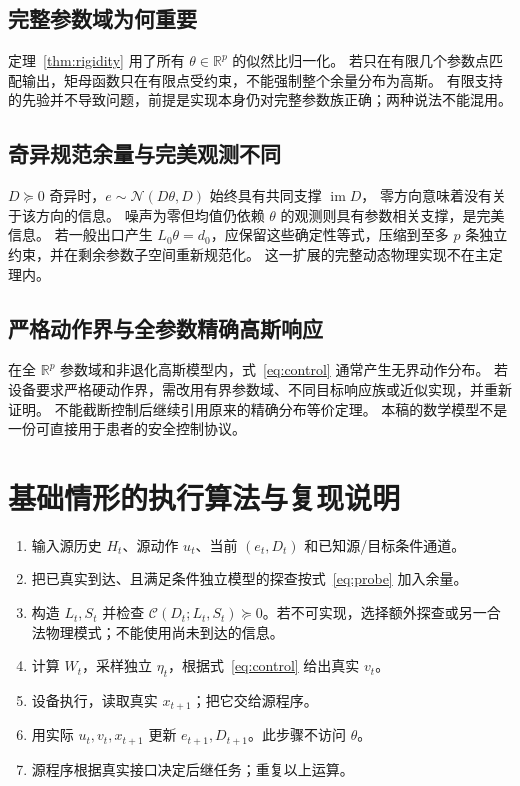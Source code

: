 \documentclass[UTF8,fontset=fandol,11pt,a4paper]{ctexart}
\newcommand{\R}{\mathbb R}
\newcommand{\N}{\mathcal N}
\newcommand{\im}{\operatorname{im}}
\theoremstyle{definition}
\theoremstyle{remark}
\numberwithin{equation}{section}
\begin{document}
\subsection{完整参数域为何重要}
定理~\ref{thm:rigidity} 用了所有 $\theta\in\R^p$ 的似然比归一化。
若只在有限几个参数点匹配输出，矩母函数只在有限点受约束，不能强制整个余量分布为高斯。
有限支持的先验并不导致问题，前提是实现本身仍对完整参数族正确；两种说法不能混用。

\subsection{奇异规范余量与完美观测不同}
$D\succeq0$ 奇异时，$e\sim\N(D\theta,D)$ 始终具有共同支撑 $\im D$，
零方向意味着没有关于该方向的信息。
噪声为零但均值仍依赖 $\theta$ 的观测则具有参数相关支撑，是完美信息。
若一般出口产生 $L_0\theta=d_0$，应保留这些确定性等式，压缩到至多 $p$ 条独立约束，并在剩余参数子空间重新规范化。
这一扩展的完整动态物理实现不在主定理内。

\subsection{严格动作界与全参数精确高斯响应}
在全 $\R^p$ 参数域和非退化高斯模型内，式~\eqref{eq:control} 通常产生无界动作分布。
若设备要求严格硬动作界，需改用有界参数域、不同目标响应族或近似实现，并重新证明。
不能截断控制后继续引用原来的精确分布等价定理。
本稿的数学模型不是一份可直接用于患者的安全控制协议。

\section{基础情形的执行算法与复现说明}

\begin{keybox}[title={算法：带信息余量的透明执行}]
\begin{enumerate}
\item 输入源历史 $H_t$、源动作 $u_t$、当前 $(e_t,D_t)$ 和已知源/目标条件通道。
\item 把已真实到达、且满足条件独立模型的探查按式~\eqref{eq:probe} 加入余量。
\item 构造 $L_t,S_t$ 并检查 $\mathcal C(D_t;L_t,S_t)\succeq0$。若不可实现，选择额外探查或另一合法物理模式；不能使用尚未到达的信息。
\item 计算 $W_t$，采样独立 $\eta_t$，根据式~\eqref{eq:control} 给出真实 $v_t$。
\item 设备执行，读取真实 $x_{t+1}$；把它交给源程序。
\item 用实际 $u_t,v_t,x_{t+1}$ 更新 $e_{t+1},D_{t+1}$。此步骤不访问 $\theta$。
\item 源程序根据真实接口决定后继任务；重复以上运算。
\end{enumerate}
\end{keybox}
\end{document}
